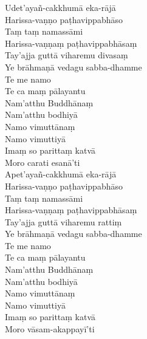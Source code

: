 Udet'ayañ-cakkhumā eka-rājā\\
Harissa-vaṇṇo paṭhavippabhāso\\
Taṃ taṃ namassāmi\\
Harissa-vaṇṇaṃ paṭhavippabhāsaṃ\\
Tay'ajja guttā viharemu divasaṃ\\
Ye brāhmaṇā vedagu sabba-dhamme\\
Te me namo\\
Te ca maṃ pālayantu\\
Nam'atthu Buddhānaṃ\\
Nam'atthu bodhiyā\\
Namo vimuttānaṃ\\
Namo vimuttiyā\\
Imaṃ so parittaṃ katvā\\
Moro carati esanā'ti\\
Apet'ayañ-cakkhumā eka-rājā\\
Harissa-vaṇṇo paṭhavippabhāso\\
Taṃ taṃ namassāmi\\
Harissa-vaṇṇaṃ paṭhavippabhāsaṃ\\
Tay'ajja guttā viharemu rattiṃ\\
Ye brāhmaṇā vedagu sabba-dhamme\\
Te me namo\\
Te ca maṃ pālayantu\\
Nam'atthu Buddhānaṃ\\
Nam'atthu bodhiyā\\
Namo vimuttānaṃ\\
Namo vimuttiyā\\
Imaṃ so parittaṃ katvā\\
Moro vāsam-akappayī'ti


